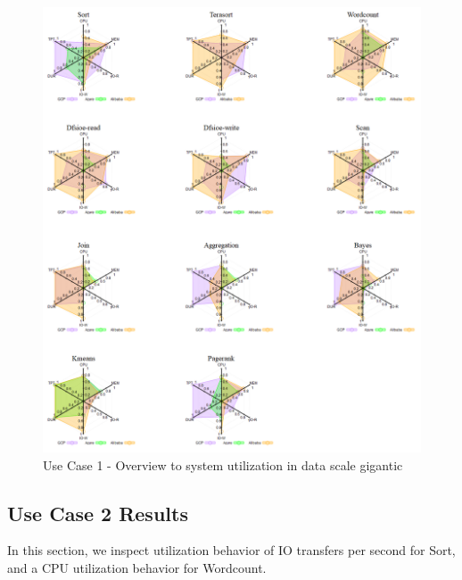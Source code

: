 \documentclass[review]{elsarticle}
\begin{document}
\begin{figure}[p]
	\caption{Use Case 1 - Overview to system utilization in data scale gigantic}
	\label{fig:uc1-gigantic-new}
	\includegraphics[width=\textwidth]{uc1-gigantic-new}
	\centering
\end{figure}


\subsection{Use Case 2 Results}
In this section, we inspect utilization behavior of IO transfers per second for Sort, and a CPU utilization behavior for Wordcount.
\end{document}
